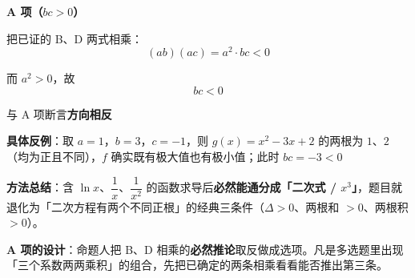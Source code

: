 \begin{answer}
\par\medskip

\textbf{A 项（$bc>0$）}

把已证的 B、D 两式相乘：
\nopagebreak[4]
\[(ab)(ac)=a^{2}\cdot bc<0\]

而 $a^{2}>0$，故
\nopagebreak[4]
\[bc<0\]

与 A 项断言\textbf{方向相反} 

\textbf{具体反例}：取 $a=1$，$b=3$，$c=-1$，则 $g(x)=x^{2}-3x+2$ 的两根为 $1$、$2$（均为正且不同），$f$ 确实既有极大值也有极小值；此时 $bc=-3<0$ 

\par\medskip

\begin{gktip}
\textbf{方法总结}：含 $\ln x$、$\dfrac1x$、$\dfrac1{x^{2}}$ 的函数求导后\textbf{必然能通分成「二次式 / $x^{3}$」}，题目就退化为「二次方程有两个不同正根」的经典三条件（$\Delta>0$、两根和 $>0$、两根积 $>0$）。

\textbf{A 项的设计}：命题人把 B、D 相乘的\textbf{必然推论}取反做成选项。凡是多选题里出现「三个系数两两乘积」的组合，先把已确定的两条相乘看看能否推出第三条。
\end{gktip}


\par\medskip

\end{answer}
